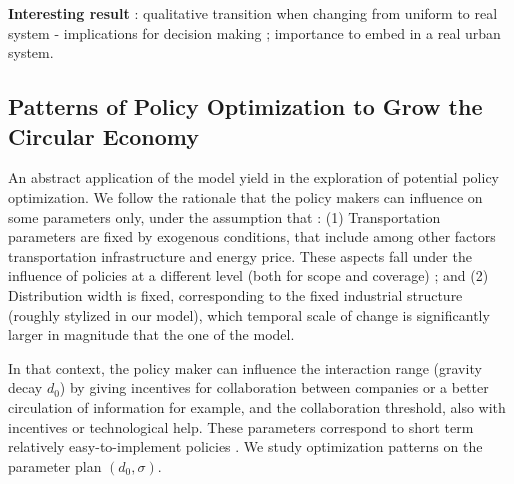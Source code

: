 \documentclass[fleqn,10pt]{wlscirep}
\begin{document}
{\textbf{Interesting result} : qualitative transition when changing from uniform to real system - implications for decision making ; importance to embed in a real urban system. 



\subsection*{Patterns of Policy Optimization to Grow the Circular Economy}

An abstract application of the model yield in the exploration of potential policy optimization. We follow the rationale that the policy makers can influence on some parameters only, under the assumption that : (1) Transportation parameters are fixed by exogenous conditions, that include among other factors transportation infrastructure and energy price. These aspects fall under the influence of policies at a different level (both for scope and coverage) ; and (2) Distribution width is fixed, corresponding to the fixed industrial structure (roughly stylized in our model), which temporal scale of change is significantly larger in magnitude that the one of the model.

In that context, the policy maker can influence the interaction range (gravity decay $d_0$) by giving incentives for collaboration between companies or a better circulation of information for example, and the collaboration threshold, also with incentives or technological help. These parameters correspond to short term relatively easy-to-implement policies . We study optimization patterns on the parameter plan $(d_0,\sigma)$. 



}
\end{document}
